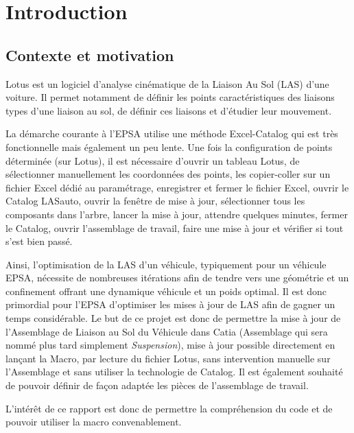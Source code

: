 \section{Introduction}

\subsection{Contexte et motivation} %

\par Lotus est un logiciel d'analyse cinématique de la Liaison Au Sol (LAS) d'une voiture. Il permet notamment de définir les points caractéristiques des liaisons types d'une liaison au sol, de définir ces liaisons et d'étudier leur mouvement.

\par La démarche courante à l'EPSA utilise une méthode Excel-Catalog qui est très fonctionnelle mais également un peu lente. Une fois la configuration de points déterminée (sur Lotus), il est nécessaire d'ouvrir un tableau Lotus, de sélectionner manuellement les coordonnées des points, les copier-coller sur un fichier Excel dédié au paramétrage, enregistrer et fermer le fichier Excel, ouvrir le Catalog LASauto, ouvrir la fenêtre de mise à jour, sélectionner tous les composants dans l'arbre, lancer la mise à jour, attendre quelques minutes, fermer le Catalog, ouvrir l'assemblage de travail, faire une mise à jour et vérifier si tout s'est bien passé.

\par Ainsi, l'optimisation de la LAS d'un véhicule, typiquement pour un véhicule EPSA, nécessite de nombreuses itérations afin de tendre vers une géométrie et un confinement offrant une dynamique véhicule et un poids optimal. Il est donc primordial pour l'EPSA d'optimiser les mises à jour de LAS afin de gagner un temps considérable. Le but de ce projet est donc de permettre la mise à jour de l'Assemblage de Liaison au Sol du Véhicule dans Catia (Assemblage qui sera nommé plus tard simplement \textit{Suspension}), mise à jour possible directement en lançant la Macro, par lecture du fichier Lotus, sans intervention manuelle sur l'Assemblage et sans utiliser la technologie de Catalog. Il est également souhaité de pouvoir définir de façon adaptée les pièces de l'assemblage de travail.

\par L'intérêt de ce rapport est donc de permettre la compréhension du code et de pouvoir utiliser la macro convenablement.


